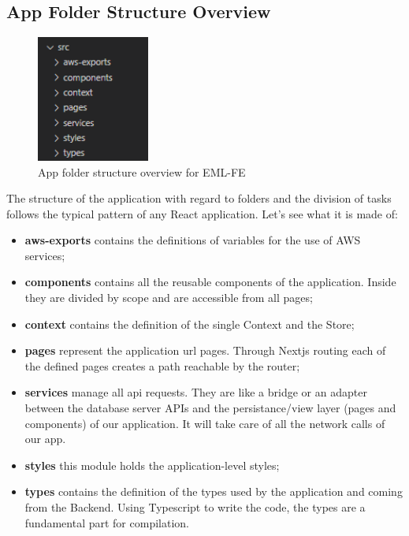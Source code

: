 \subsection{App Folder Structure Overview} \label{_folder}

\begin{figure}[H]
    \centering
    \includegraphics[width=10em]{res/images/frontend-diagrams/app-folder-structure.png}
    \caption{App folder structure overview for EML-FE}
\end{figure}

The structure of the application with regard to folders and the division of tasks follows the typical pattern of any React application. Let's see what it is made of:

\begin{itemize}
    \item \textbf{aws-exports} contains the definitions of variables for the use of AWS services;
    \item \textbf{components} contains all the reusable components of the application. Inside they are divided by scope and are accessible from all pages;
    \item \textbf{context} contains the definition of the single Context and the Store;
    \item \textbf{pages} represent the application url pages. Through Nextjs routing each of the defined pages creates a path reachable by the router;
    \item \textbf{services} manage all api requests. They are like a bridge or an adapter between the database server APIs and the persistance/view layer (pages and components) of our application. It will take care of all the network calls of our app.
    \item \textbf{styles} this module holds the application-level styles;
    \item \textbf{types} contains the definition of the types used by the application and coming from the Backend. Using Typescript to write the code, the types are a fundamental part for compilation.
\end{itemize}